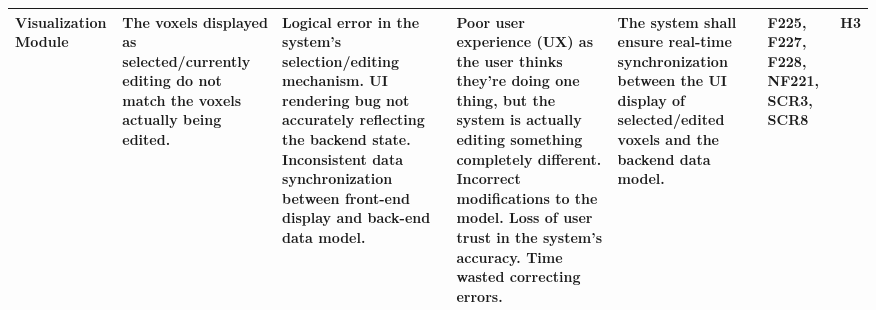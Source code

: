 \documentclass{article}
\begin{document}
\begin{landscape}
\begin{table}[H]
\begin{tabular}{|p{3cm}|p{3cm}|p{3.8cm}|p{3.8cm}|p{5.5cm}|p{2cm}|p{1cm}|}
\hline
Visualization Module & The voxels displayed as selected/currently editing do not match the voxels actually being edited. & \textbullet{} Logical error in the system's selection/editing mechanism. \newline \textbullet{} UI rendering bug not accurately reflecting the backend state. \newline \textbullet{} Inconsistent data synchronization between front-end display and back-end data model. & \textbullet{} Poor user experience (UX) as the user thinks they're doing one thing, but the system is actually editing something completely different. \newline \textbullet{} Incorrect modifications to the model. \newline \textbullet{} Loss of user trust in the system's accuracy. \newline \textbullet{} Time wasted correcting errors. & The system shall ensure real-time synchronization between the UI display of selected/edited voxels and the backend data model.  & F225, F227, F228, NF221, SCR3, SCR8 & H3 \\
\hline
\end{tabular}
\end{table}


\end{landscape}
\end{document}
